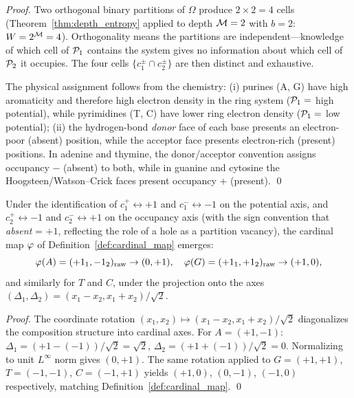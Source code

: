 \begin{proof}
Two orthogonal binary partitions of $\Omega$ produce $2 \times 2 = 4$ cells
(Theorem~\ref{thm:depth_entropy} applied to depth $\mathcal{M} = 2$ with $b = 2$:
$W = 2^{\mathcal{M}} = 4$). Orthogonality means the partitions are
independent---knowledge of which cell of $\mathcal{P}_1$ contains the system
gives no information about which cell of $\mathcal{P}_2$ it occupies. The four
cells $\{c^{\pm}_1 \cap c^{\pm}_2\}$ are then distinct and exhaustive.

The physical assignment follows from the chemistry: (i) purines (A, G)
have high aromaticity and therefore high electron density in the ring system
($\mathcal{P}_1 = $ high potential), while pyrimidines (T, C) have lower ring
electron density ($\mathcal{P}_1 = $ low potential); (ii) the hydrogen-bond
\emph{donor} face of each base presents an electron-poor (absent) position,
while the acceptor face presents electron-rich (present) positions. In adenine
and thymine, the donor/acceptor convention assigns occupancy $-$ (absent) to
both, while in guanine and cytosine the Hoogsteen/Watson--Crick faces present
occupancy $+$ (present). \qed
\end{proof}

\begin{corollary}
\label{cor:cardinal_from_geometry}
Under the identification of $c^+_1 \leftrightarrow +1$ and $c^-_1 \leftrightarrow -1$
on the potential axis, and $c^+_2 \leftrightarrow -1$ and $c^-_2 \leftrightarrow +1$
on the occupancy axis (with the sign convention that \emph{absent} = $+1$,
reflecting the role of a hole as a partition vacancy), the cardinal map
$\varphi$ of Definition~\ref{def:cardinal_map} emerges:
\begin{equation}
  \varphi(A) = (+1_1, -1_2)_{\mathrm{raw}} \to (0, +1), \quad
  \varphi(G) = (+1_1, +1_2)_{\mathrm{raw}} \to (+1, 0),
\end{equation}
and similarly for $T$ and $C$, under the projection onto the axes
$(\Delta_1, \Delta_2) = (x_1 - x_2, x_1 + x_2)/\sqrt{2}$.
\end{corollary}

\begin{proof}
The coordinate rotation $(x_1, x_2) \mapsto (x_1 - x_2, x_1 + x_2)/\sqrt{2}$
diagonalizes the composition structure into cardinal axes. For $A = (+1, -1)$:
$\Delta_1 = (+1 - (-1))/\sqrt{2} = \sqrt{2}$, $\Delta_2 = (+1 + (-1))/\sqrt{2} = 0$.
Normalizing to unit $L^\infty$ norm gives $(0, +1)$. The same rotation applied
to $G = (+1, +1)$, $T = (-1, -1)$, $C = (-1, +1)$ yields
$(+1, 0)$, $(0, -1)$, $(-1, 0)$ respectively,
matching Definition~\ref{def:cardinal_map}. \qed
\end{proof}

